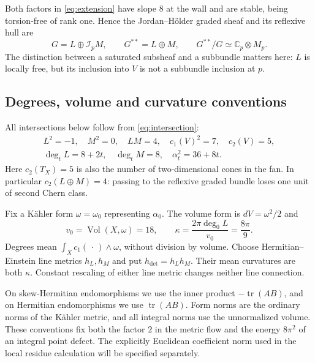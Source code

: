 \documentclass[11pt]{amsart}
\theoremstyle{definition}
\theoremstyle{remark}
\newcommand{\CC}{\mathbb C}
\newcommand{\cI}{\mathcal I}
\newcommand{\tr}{\operatorname{tr}}
\newcommand{\Vol}{\operatorname{Vol}}
\begin{document}
Both factors in \eqref{eq:extension} have slope $8$ at the wall and
are stable, being torsion-free of rank one. Hence the Jordan--H\"older
graded sheaf and its reflexive hull are
\begin{equation}\label{eq:graded}
 G=L\oplus\cI_pM,\qquad G^{**}=L\oplus M,
 \qquad G^{**}/G\simeq\CC_p\otimes M_p.
\end{equation}
The distinction between a saturated subsheaf and a subbundle matters here:
$L$ is locally free, but its inclusion into $V$ is not a subbundle
inclusion at $p$.

\subsection{Degrees, volume and curvature conventions}
All intersections below follow from \eqref{eq:intersection}:
\begin{equation}\label{eq:chern-data}
\begin{gathered}
 L^2=-1,\quad M^2=0,\quad LM=4,\quad c_1(V)^2=7,\quad c_2(V)=5,\\
 \deg_t L=8+2t,\quad\deg_t M=8,\quad
 \alpha_t^2=36+8t.
\end{gathered}
\end{equation}
Here $c_2(T_X)=5$ is also the number of two-dimensional cones in the fan.
In particular $c_2(L\oplus M)=4$: passing to the reflexive graded bundle
loses one unit of second Chern class.

Fix a K\"ahler form $\omega=\omega_0$ representing $\alpha_0$. The
volume form is $dV=\omega^2/2$ and
\begin{equation}\label{eq:volume}
 v_0=\Vol(X,\omega)=18,\qquad
 \kappa=\frac{2\pi\deg_0L}{v_0}=\frac{8\pi}{9}.
\end{equation}
Degrees mean $\int_X c_1(\,\cdot\,)\wedge\omega$, without division by volume.
Choose Hermitian--Einstein line metrics $h_L,h_M$ and put
$h_{\det}=h_Lh_M$. Their mean curvatures are both $\kappa$.
Constant rescaling of either line metric changes neither line connection.

On skew-Hermitian endomorphisms we use the inner product
$-\tr(AB)$, and on Hermitian endomorphisms we use $\tr(AB)$.
Form norms are the ordinary norms of the K\"ahler metric, and all integral
norms use the unnormalized volume. These conventions fix both the factor
$2$ in the metric flow and the energy $8\pi^2$ of an integral point defect.
The explicitly Euclidean coefficient norm used in the local residue
calculation will be specified separately.
\end{document}
